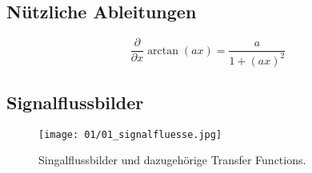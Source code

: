 \subsection{Nützliche Ableitungen}
    \begin{equation*}
        \frac{\partial}{\partial x}\arctan(ax) = \frac{a}{1+(ax)^2}
    \end{equation*}

\vfill\null\columnbreak
\subsection{Signalflussbilder}
    \begin{figure}[H]
        \centering
        \texttt{[image: 01/01\_signalfluesse.jpg]}
        \caption{Singalflussbilder und dazugehörige Transfer Functions.}
    \end{figure}